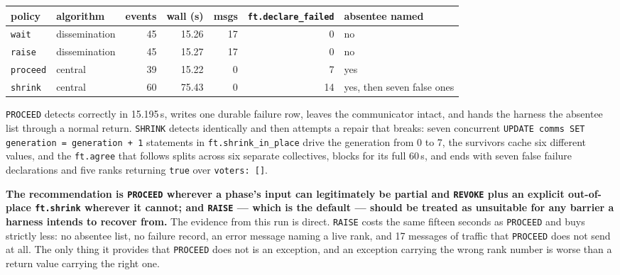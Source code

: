 \documentclass[11pt]{article}
\begin{document}
\begin{center}\footnotesize
\begin{tabular}{@{}llrrrrl@{}}
\toprule
policy & algorithm & events & wall (s) & msgs & \texttt{ft.declare\_failed} & absentee named \\
\midrule
\texttt{wait}    & dissemination & 45 & 15.26 & 17 & 0  & no \\
\texttt{raise}   & dissemination & 45 & 15.27 & 17 & 0  & no \\
\texttt{proceed} & central       & 39 & 15.22 & 0  & 7  & yes \\
\texttt{shrink}  & central       & 60 & 75.43 & 0  & 14 & yes, then seven false ones \\
\bottomrule
\end{tabular}\normalsize
\end{center}

\texttt{PROCEED} detects correctly in 15.195\,s, writes one durable failure row, leaves
the communicator intact, and hands the harness the absentee list through a normal return.
\texttt{SHRINK} detects identically and then attempts a repair that breaks: seven
concurrent \texttt{UPDATE comms SET generation = generation + 1} statements in
\texttt{ft.shrink\_in\_place} drive the generation from 0 to 7, the survivors cache six
different values, and the \texttt{ft.agree} that follows splits across six separate
collectives, blocks for its full 60\,s, and ends with seven false failure declarations and
five ranks returning \texttt{true} over \texttt{voters:\ []}.

\textbf{The recommendation is \texttt{PROCEED} wherever a phase's input can legitimately
be partial and \texttt{REVOKE} plus an explicit out-of-place \texttt{ft.shrink} wherever
it cannot; and \texttt{RAISE} --- which is the default --- should be treated as
unsuitable for any barrier a harness intends to recover from.} The evidence from this run
is direct. \texttt{RAISE} costs the same fifteen seconds as \texttt{PROCEED} and buys
strictly less: no absentee list, no failure record, an error message naming a live rank,
and 17 messages of traffic that \texttt{PROCEED} does not send at all. The only thing it
provides that \texttt{PROCEED} does not is an exception, and an exception carrying the
wrong rank number is worse than a return value carrying the right one.
\end{document}
